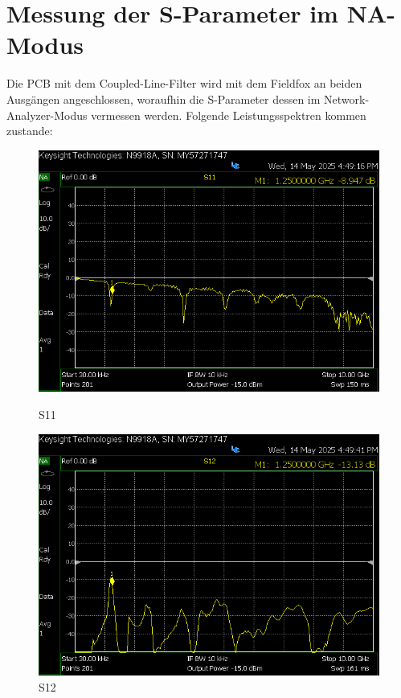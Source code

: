 \section{Messung der S-Parameter im NA-Modus}
Die PCB mit dem Coupled-Line-Filter wird mit dem Fieldfox an beiden Ausgängen angeschlossen, 
    woraufhin die S-Parameter dessen im Network-Analyzer-Modus vermessen werden. Folgende Leistungsspektren kommen zustande:
    \begin{figure}[H]
        
        \begin{minipage}{0.45\textwidth}
            \centering
            \includegraphics[width=\linewidth]{Pictures/S11neuCooleGrupp.png}
            \caption*{S11}
        \end{minipage}
        \hfill
        \begin{minipage}{0.45\textwidth}
            \centering
            \includegraphics[width=\linewidth]{Pictures/S12neuCooleGrupp.png}
            \caption*{S12}
        \end{minipage}


\end{figure}
